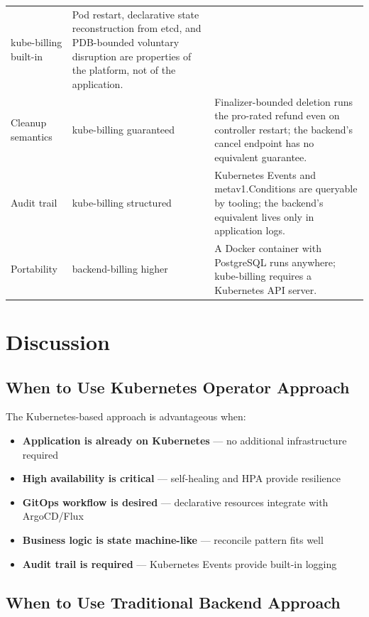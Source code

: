 \begin{table}[h]
\begin{tabularx}{\textwidth}{@{}lXX@{}}
kube-billing built-in &
Pod restart, declarative state reconstruction from etcd, and PDB-bounded voluntary disruption are properties of the platform, not of the application. \\
Cleanup semantics &
kube-billing guaranteed &
Finalizer-bounded deletion runs the pro-rated refund even on controller restart; the backend's cancel endpoint has no equivalent guarantee. \\
Audit trail &
kube-billing structured &
Kubernetes Events and metav1.Conditions are queryable by tooling; the backend's equivalent lives only in application logs. \\
Portability &
backend-billing higher &
A Docker container with PostgreSQL runs anywhere; kube-billing requires a Kubernetes API server. \\
\bottomrule
\end{tabularx}
\end{table}

\section{Discussion}

\subsection{When to Use Kubernetes Operator Approach}

The Kubernetes-based approach is advantageous when:

\begin{itemize}
    \item \textbf{Application is already on Kubernetes} --- no additional infrastructure required
    \item \textbf{High availability is critical} --- self-healing and HPA provide resilience
    \item \textbf{GitOps workflow is desired} --- declarative resources integrate with ArgoCD/Flux
    \item \textbf{Business logic is state machine-like} --- reconcile pattern fits well
    \item \textbf{Audit trail is required} --- Kubernetes Events provide built-in logging
\end{itemize}

\subsection{When to Use Traditional Backend Approach}

